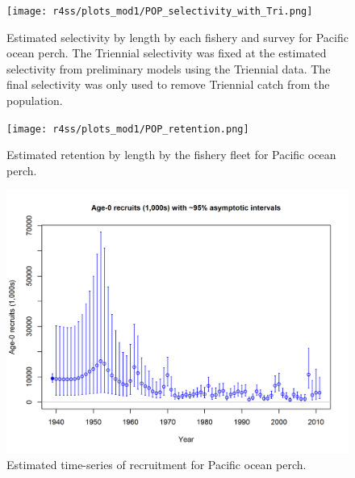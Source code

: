 \documentclass[12pt,]{article}
\begin{document}
\FloatBarrier 

\begin{figure}
\centering
\texttt{[image: r4ss/plots\_mod1/POP\_selectivity\_with\_Tri.png]}
\caption{Estimated selectivity by length by each fishery and survey for
Pacific ocean perch. The Triennial selectivity was fixed at the
estimated selectivity from preliminary models using the Triennial data.
The final selectivity was only used to remove Triennial catch from the
population. \label{fig:selex}}
\end{figure}

\FloatBarrier 

\begin{figure}
\centering
\texttt{[image: r4ss/plots\_mod1/POP\_retention.png]}
\caption{Estimated retention by length by the fishery fleet for Pacific
ocean perch. \label{fig:retention}}
\end{figure}

\FloatBarrier 

\begin{figure}
\centering
\includegraphics{r4ss/plots_mod1/ts11_Age-0_recruits_(1000s)_with_95_asymptotic_intervals.png}
\caption{Estimated time-series of recruitment for Pacific ocean perch.
\label{fig:recruits}}
\end{figure}

\FloatBarrier
\end{document}
